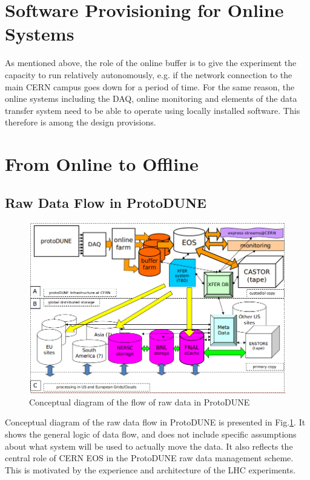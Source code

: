 \documentclass[pdftex,12pt,letter]{article}
\newcommand{\pd}{ProtoDUNE\xspace}
\begin{document}
\section{Software Provisioning for Online Systems}
As mentioned above, the role of the online buffer is to give the experiment the capacity
to run relatively autonomously, e.g. if the network connection to the main CERN campus
goes down for a period of time. For the same reason, the online systems including the
DAQ, online monitoring and elements of the data transfer system need to be able to operate
using locally installed software. This therefore is among the design provisions.


\section{From Online to Offline}

\subsection{Raw Data Flow in \pd}
\label{sec:raw_concept}
\begin{figure}[tbh]
\centering\includegraphics[width=\linewidth]{protoDUNE_raw_data_concept.png}
\caption{\label{fig:raw_concept}Conceptual diagram of the flow of raw data in \pd}
\end{figure}

\noindent
Conceptual diagram of the raw data flow in \pd is presented in Fig.\ref{fig:raw_concept}. It shows the general logic
of data flow, and does not include specific assumptions about what system will be used to actually move the data.
It also reflects the central role of CERN EOS in the \pd raw data management scheme. This is motivated by the experience
and architecture of the LHC experiments.
\end{document}
